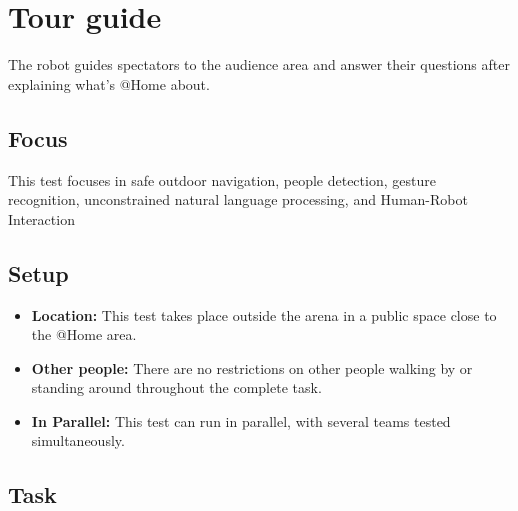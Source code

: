 \section{Tour guide}
The robot guides spectators to the audience area and answer their questions after explaining what's @Home about.

\subsection{Focus}
This test focuses in safe outdoor navigation, people detection, gesture recognition, unconstrained natural language processing, and Human-Robot Interaction

\subsection{Setup}
\begin{itemize}
	\item \textbf{Location:} This test takes place outside the arena in a public space close to the @Home area.

	\item \textbf{Other people:} There are no restrictions on other people walking by or standing around throughout the complete task.

	\item \textbf{In Parallel:} This test can run in parallel, with several teams tested simultaneously.
\end{itemize}

\subsection{Task}

